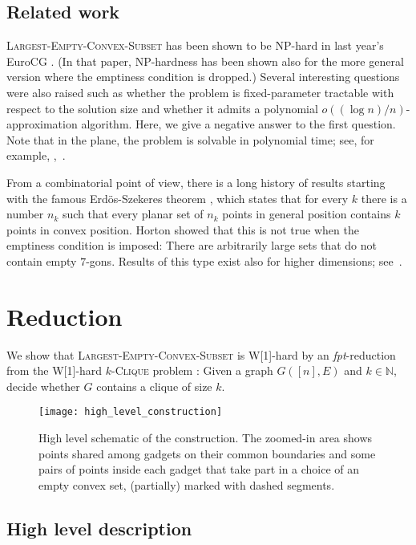 \documentclass[11pt,a4paper]{article}
\begin{document}
\subsection{Related work}

\textsc{Largest-Empty-Convex-Subset} has been shown to be NP-hard in last year's EuroCG \cite{KW12}. (In that paper, NP-hardness has been shown also for the more general version where the emptiness condition is dropped.) Several interesting questions were also raised such as whether the problem is fixed-parameter tractable with respect to the solution size and whether it admits a polynomial $o((\log n)/n)$-approximation algorithm. Here, we give a negative answer to the first question.
Note that in the plane, the problem is solvable in polynomial time; see, for example, \cite{AR85},~\cite{DEO90}.

From a combinatorial point of view, there is a long history of results starting with the famous Erd\"os-Szekeres theorem \cite{ES35}, which states that for every $k$ there is a number $n_k$ such that every planar set of $n_k$ points in general position contains $k$ points in convex position. Horton \cite{Ho83} showed that this is not true when the emptiness condition is imposed: There are arbitrarily large sets that do not contain empty $7$-gons. Results of this type exist also for higher dimensions; see~\cite{MS00}.



\section{Reduction}
\label{sec:reduction}

We show that \textsc{Largest-Empty-Convex-Subset} is W[1]-hard by an \emph{fpt}-reduction from the W[1]-hard $k$-\textsc{Clique} problem \cite{FG06}: Given a
graph $G([n], E)$ and $k\in \mathbb{N}$, decide whether $G$ contains a clique of size $k$.

\begin{figure}
\centering
	\texttt{[image: high\_level\_construction]}
	\caption{High level schematic of the construction. The zoomed-in area shows points shared among gadgets on their common boundaries and some pairs of points inside each gadget that take part in a choice of an empty convex set, (partially) marked with dashed segments. }
	\label{fig:high_level_construction}
\end{figure}

\subsection{High level description}
\end{document}
